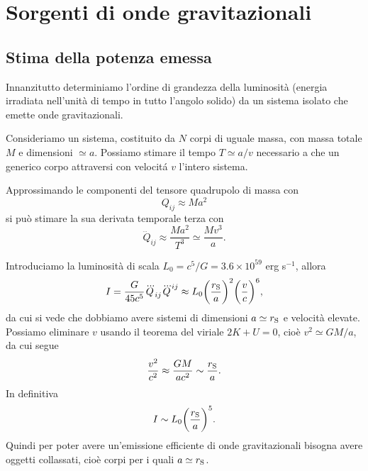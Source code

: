 \section{Sorgenti di onde gravitazionali}
\label{sec:sorgenti-onde-grav}


\subsection{Stima della potenza emessa}
\label{sec:potenza-emessa}

Innanzitutto determiniamo l'ordine di grandezza della luminosità (energia
irradiata nell'unità di tempo in tutto l'angolo solido)
da un sistema isolato che emette onde gravitazionali.

Consideriamo un sistema, costituito da $N$ corpi di uguale massa, con massa
totale $M$ e dimensioni $\simeq a$.  Possiamo stimare il tempo $T \simeq a/v$
necessario a che un generico corpo attraversi con velocit\'a $v$ l'intero
sistema.

Approssimando le componenti del tensore quadrupolo di massa con
\begin{equation}
  Q_{ij} \approx M a^{2}
\end{equation}
si può stimare la sua derivata temporale terza con
\begin{equation}
  \dddot{Q}_{ij} \approx \frac{M a^{2}}{T^{3}} \simeq \frac{Mv^{3}}{a}.
\end{equation}

Introduciamo la luminosità di scala $L_{0} = c^{5}/G = 3.6 \times 10^{59}$ erg
s$^{-1}$, allora
\begin{equation}
  I = \frac{G}{45c^{5}} \dddot{Q}_{ij} \dddot{Q}^{ij} \approx
  L_{0} \bigg(\frac{r_{\textup{S}}}{a}\bigg)^{2} \bigg(\frac{v}{c}\bigg)^{6},
\end{equation}
da cui si vede che dobbiamo avere sistemi di dimensioni $a \simeq
r_{\textup{S}}$ e velocità elevate.  Possiamo eliminare $v$ usando il teorema
del viriale $2K + U = 0$, cioè $v^{2} \simeq GM/a$, da cui segue
\begin{equation}
  \frac{v^{2}}{c^{2}} \approx \frac{GM}{ac^{2}} \sim   \frac{r_{\textup{S}}}{a}.
\end{equation}
In definitiva
\begin{equation}
  I \sim L_{0} \bigg(\frac{r_{\textup{S}}}{a}\bigg)^{5}.
\end{equation}
Quindi per poter avere un'emissione efficiente di onde gravitazionali bisogna
avere oggetti collassati, cioè corpi per i quali $a \simeq r_{\textup{S}}$.

